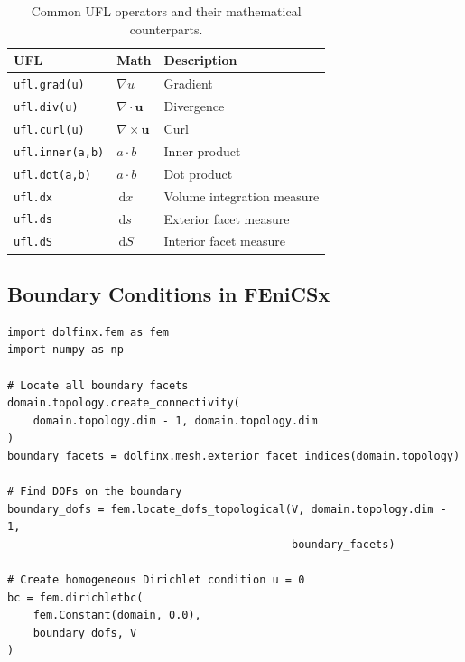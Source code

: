 \documentclass[11pt]{article}
\newcommand{\dx}{\,\mathrm{d}x}
\newcommand{\ds}{\,\mathrm{d}s}
\newcommand{\dS}{\,\mathrm{d}S}
\begin{document}
\begin{table}[ht]
  \centering
  \caption{Common UFL operators and their mathematical counterparts.}
  \label{tab:ufl}
  \begin{tabular}{lll}
    \toprule
    \textbf{UFL}            & \textbf{Math}               & \textbf{Description}         \\
    \midrule
    \texttt{ufl.grad(u)}    & $\nabla u$                  & Gradient                     \\
    \texttt{ufl.div(u)}     & $\nabla \cdot \mathbf{u}$   & Divergence                   \\
    \texttt{ufl.curl(u)}    & $\nabla \times \mathbf{u}$  & Curl                         \\
    \texttt{ufl.inner(a,b)} & $a \cdot b$                 & Inner product                \\
    \texttt{ufl.dot(a,b)}   & $a \cdot b$                 & Dot product                  \\
    \texttt{ufl.dx}         & $\dx$                       & Volume integration measure   \\
    \texttt{ufl.ds}         & $\ds$                       & Exterior facet measure       \\
    \texttt{ufl.dS}         & $\dS$                       & Interior facet measure       \\
    \bottomrule
  \end{tabular}
\end{table}

\subsection{Boundary Conditions in FEniCSx}

\begin{lstlisting}[style=python, caption={Applying homogeneous Dirichlet boundary conditions.}]
import dolfinx.fem as fem
import numpy as np

# Locate all boundary facets
domain.topology.create_connectivity(
    domain.topology.dim - 1, domain.topology.dim
)
boundary_facets = dolfinx.mesh.exterior_facet_indices(domain.topology)

# Find DOFs on the boundary
boundary_dofs = fem.locate_dofs_topological(V, domain.topology.dim - 1,
                                            boundary_facets)

# Create homogeneous Dirichlet condition u = 0
bc = fem.dirichletbc(
    fem.Constant(domain, 0.0),
    boundary_dofs, V
)
\end{lstlisting}
\end{document}
